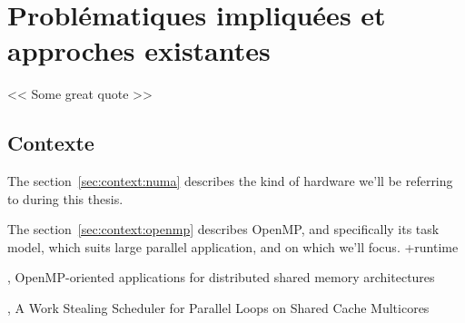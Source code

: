 \part{Problématiques impliquées et approches existantes}

\begin{savequote}[6cm]
<< Some great quote  >>
\end{savequote}
\chapter{Contexte}
\chaptertoc

The section~\ref{sec:context:numa} describes the kind of hardware we'll be referring to during this thesis.

The section~\ref{sec:context:openmp} describes OpenMP, and specifically its task model, which suits large parallel application, and on which we'll focus.
+runtime








\cite{Marowka2004}, OpenMP-oriented applications for distributed shared memory architectures


\cite{Tchiboukdjian2010}, A Work Stealing Scheduler for Parallel Loops on Shared Cache Multicores

